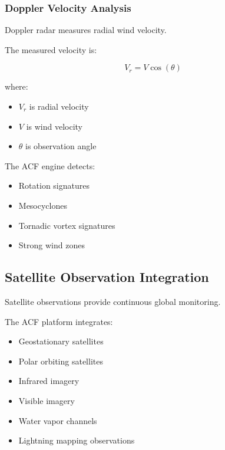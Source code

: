 
\subsubsection{Doppler Velocity Analysis}

Doppler radar measures radial wind velocity.

The measured velocity is:

\[
V_r =
V
\cos(\theta)
\]

where:

\begin{itemize}

\item $V_r$ is radial velocity

\item $V$ is wind velocity

\item $\theta$ is observation angle

\end{itemize}


The ACF engine detects:

\begin{itemize}

\item Rotation signatures

\item Mesocyclones

\item Tornadic vortex signatures

\item Strong wind zones

\end{itemize}



\subsection{Satellite Observation Integration}

Satellite observations provide continuous global monitoring.

The ACF platform integrates:

\begin{itemize}

\item Geostationary satellites

\item Polar orbiting satellites

\item Infrared imagery

\item Visible imagery

\item Water vapor channels

\item Lightning mapping observations

\end{itemize}


